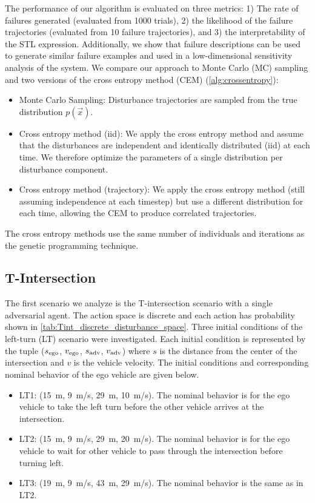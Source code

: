 The performance of our algorithm is evaluated on three metrics: 1) The rate of failures generated (evaluated from \num{1000} trials), 2) the likelihood of the failure trajectories (evaluated from \num{10} failure trajectories), and 3) the interpretability of the STL expression. Additionally, we show that failure descriptions can be used to generate similar failure examples and used in a low-dimensional sensitivity analysis of the system. We compare our approach to Monte Carlo (MC) sampling and two versions of the cross entropy method (CEM) (\cref{alg:crossentropy}):
\begin{itemize}
    \item Monte Carlo Sampling: Disturbance trajectories are sampled from the true distribution $p(\vec{x})$.
    \item Cross entropy method (iid): We apply the cross entropy method and assume that the disturbances are independent and identically distributed (iid) at each time. We therefore optimize the parameters of a single distribution per disturbance component. 
    \item Cross entropy method (trajectory): We apply the cross entropy method (still assuming independence at each timestep) but use a different distribution for each time, allowing the CEM to produce correlated trajectories. 
\end{itemize}
The cross entropy methods use the same number of individuals and iterations as the genetic programming technique. 

\subsection{T-Intersection}

The first scenario we analyze is the T-intersection scenario with a single adversarial agent. The action space is discrete and each action has probability shown in \cref{tab:Tint_discrete_disturbance_space}.  Three initial conditions of the left-turn (LT) scenario were investigated. Each initial condition is represented by the tuple ($s_{\rm ego}$, $v_{\rm ego}$, $s_{\rm adv}$, $v_{\rm adv}$) where $s$ is the distance from the center of the intersection and $v$ is the vehicle velocity.  The initial conditions and corresponding nominal behavior of the ego vehicle are given below.
\begin{itemize}
    \item LT1: (\SI{15}{m}, \SI{9}{m/s}, \SI{29}{m}, \SI{10}{m/s}). The nominal behavior is for the ego vehicle to take the left turn before the other vehicle arrives at the intersection.
    \item LT2: (\SI{15}{m}, \SI{9}{m/s}, \SI{29}{m}, \SI{20}{m/s}). The nominal behavior is for the ego vehicle to wait for other vehicle to pass through the intersection before turning left.
    \item LT3: (\SI{19}{m}, \SI{9}{m/s}, \SI{43}{m}, \SI{29}{m/s}). The nominal behavior is the same as in LT2.
\end{itemize}

